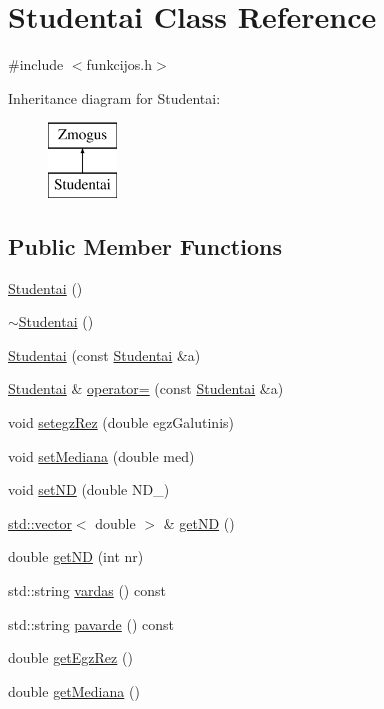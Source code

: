 \hypertarget{class_studentai}{}\section{Studentai Class Reference}
\label{class_studentai}


{\ttfamily \#include $<$funkcijos.\+h$>$}

Inheritance diagram for Studentai\+:\begin{figure}[H]
\begin{center}
\leavevmode
\includegraphics[height=2.000000cm]{class_studentai}
\end{center}
\end{figure}
\subsection*{Public Member Functions}
\begin{DoxyCompactItemize}
\item 
\mbox{\hyperlink{class_studentai_a8f53d55bca475d5bf1973f4f3c53f047}{Studentai}} ()
\item 
\mbox{\hyperlink{class_studentai_a10895815f551906aae4c2823bfd1bbc5}{$\sim$\+Studentai}} ()
\item 
\mbox{\hyperlink{class_studentai_a0c7d19b397626f33dc2e127d7c41c445}{Studentai}} (const \mbox{\hyperlink{class_studentai}{Studentai}} \&a)
\item 
\mbox{\hyperlink{class_studentai}{Studentai}} \& \mbox{\hyperlink{class_studentai_a5b971c5bfd9e3ec4ba7cd7aa1ab31db5}{operator=}} (const \mbox{\hyperlink{class_studentai}{Studentai}} \&a)
\item 
void \mbox{\hyperlink{class_studentai_ad4979b0c6137e0ce9edad1d609bed522}{setegz\+Rez}} (double egz\+Galutinis)
\item 
void \mbox{\hyperlink{class_studentai_a54ec3efbba483b0184c0fe3eafe40b67}{set\+Mediana}} (double med)
\item 
void \mbox{\hyperlink{class_studentai_af044b7fd795d8df0bf899ca91c82f32d}{set\+ND}} (double N\+D\+\_\+)
\item 
\mbox{\hyperlink{vector_8cpp_a428a4ddfbed4c2db0ef58ecfffdccf8d}{std\+::vector}}$<$ double $>$ \& \mbox{\hyperlink{class_studentai_af78d09bf07faaf71bd442559b751068d}{get\+ND}} ()
\item 
double \mbox{\hyperlink{class_studentai_a3bc596569b26bf9673c772f844fbc756}{get\+ND}} (int nr)
\item 
std\+::string \mbox{\hyperlink{class_studentai_a9c1d7911e85eac3b260a27dba06067dd}{vardas}} () const
\item 
std\+::string \mbox{\hyperlink{class_studentai_af77caf5768840f5660954fbe64745efa}{pavarde}} () const
\item 
double \mbox{\hyperlink{class_studentai_a9f8cc8dd7f888c7a8d9fb2db070195d6}{get\+Egz\+Rez}} ()
\item 
double \mbox{\hyperlink{class_studentai_a84ac1c18fb51c7c486df8a1f7360c156}{get\+Mediana}} ()
\end{DoxyCompactItemize}
